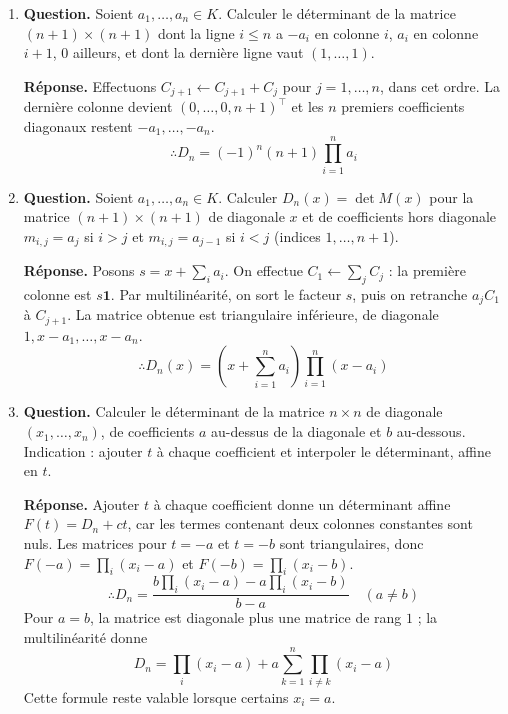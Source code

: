 \documentclass[12pt, a4paper]{article}
\begin{document}
\begin{enumerate}[label=5.\arabic*., start=54]
  \item \begin{minipage}[t]{\linewidth}\raggedright
\textbf{Question.} Soient $a_1,\ldots,a_n\in K$. Calculer le déterminant de la matrice $(n+1)\times(n+1)$ dont la ligne $i\leq n$ a $-a_i$ en colonne $i$, $a_i$ en colonne $i+1$, $0$ ailleurs, et dont la dernière ligne vaut $(1,\ldots,1)$.
\par\smallskip
\textbf{Réponse.} Effectuons $C_{j+1}\leftarrow C_{j+1}+C_j$ pour $j=1,\ldots,n$, dans cet ordre.
    La dernière colonne devient $(0,\ldots,0,n+1)^\top$ et les $n$ premiers coefficients diagonaux restent $-a_1,\ldots,-a_n$.
    \[
      \therefore D_n=(-1)^n(n+1)\prod_{i=1}^n a_i
    \]
\end{minipage}

  \item \begin{minipage}[t]{\linewidth}\raggedright
\textbf{Question.} Soient $a_1,\ldots,a_n\in K$. Calculer $D_n(x)=\det M(x)$ pour la matrice $(n+1)\times(n+1)$ de diagonale $x$ et de coefficients hors diagonale $m_{i,j}=a_j$ si $i>j$ et $m_{i,j}=a_{j-1}$ si $i<j$ (indices $1,\ldots,n+1$).
\par\smallskip
\textbf{Réponse.} Posons $s=x+\sum_i a_i$. On effectue $C_1\leftarrow\sum_j C_j$ : la première colonne est $s\boldsymbol{1}$.
    Par multilinéarité, on sort le facteur $s$, puis on retranche $a_jC_1$ à $C_{j+1}$.
    La matrice obtenue est triangulaire inférieure, de diagonale $1,x-a_1,\ldots,x-a_n$.
    \[
      \therefore D_n(x)=\left(x+\sum_{i=1}^n a_i\right)\prod_{i=1}^n(x-a_i)
    \]
\end{minipage}

  \item \begin{minipage}[t]{\linewidth}\raggedright
\textbf{Question.} Calculer le déterminant de la matrice $n\times n$ de diagonale $(x_1,\ldots,x_n)$, de coefficients $a$ au-dessus de la diagonale et $b$ au-dessous. Indication : ajouter $t$ à chaque coefficient et interpoler le déterminant, affine en $t$.
\par\smallskip
\textbf{Réponse.} Ajouter $t$ à chaque coefficient donne un déterminant affine $F(t)=D_n+ct$, car les termes contenant deux colonnes constantes sont nuls.
    Les matrices pour $t=-a$ et $t=-b$ sont triangulaires, donc
    $F(-a)=\prod_i(x_i-a)$ et $F(-b)=\prod_i(x_i-b)$.
    \[
      \therefore D_n=\frac{b\prod_i(x_i-a)-a\prod_i(x_i-b)}{b-a}\quad(a\neq b)
    \]
    Pour $a=b$, la matrice est diagonale plus une matrice de rang $1$ ; la multilinéarité donne
    \[
      D_n=\prod_i(x_i-a)+a\sum_{k=1}^n\prod_{i\neq k}(x_i-a)
    \]
    Cette formule reste valable lorsque certains $x_i=a$.
\end{minipage}


\end{enumerate}
\end{document}
